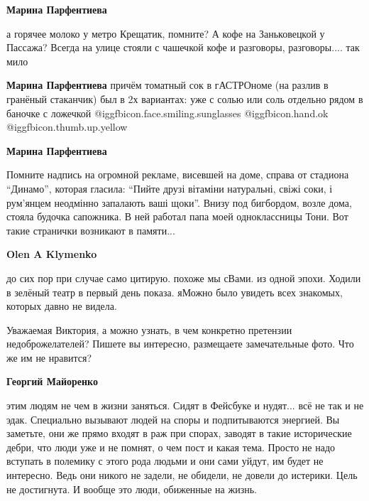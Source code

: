 \begin{itemize}
\begin{itemize} %
\textbf{Марина Парфентиева} 

а горячее молоко у метро Крещатик, помните? А кофе на Заньковецкой у Пассажа?
Всегда на улице стояли с чашечкой кофе и разговоры, разговоры.... так мило

\textbf{Марина Парфентиева} причём томатный сок в гАСТРОноме (на разлив в гранёный стаканчик) был в 2х вариантах: уже с солью или соль отдельно рядом в баночке с ложечкой  @igg{fbicon.face.smiling.sunglasses}  @igg{fbicon.hand.ok}  @igg{fbicon.thumb.up.yellow} 

\textbf{Марина Парфентиева} 

Помните надпись на огромной рекламе, висевшей на доме, справа от стадиона
\enquote{Динамо}, которая гласила: \enquote{Пийте друзі вітаміни натуральні, свіжі соки, і
рум'янцем неодмінно запалають ваші щоки}. Внизу под бигбордом, возле дома,
стояла будочка сапожника. В ней работал папа моей одноклассницы Тони. Вот такие
странички возникают в памяти...

\begin{itemize} %
\textbf{Olen A Klymenko} 

до сих пор при случае само цитирую. похоже мы сВами. из одной эпохи. Ходили в
зелёный театр в первый день показа. яМожно было увидеть всех знакомых, которых
давно не видела.

\end{itemize} %

\end{itemize} %


Уважаемая Виктория, а можно узнать, в чем конкретно претензии недоброжелателей?
Пишете вы интересно, размещаете замечательные фото. Что же им не нравится?

\begin{itemize} %
\textbf{Георгий Майоренко} 

этим людям не чем в жизни заняться. Сидят в Фейсбуке и нудят... всё не так и не
эдак. Специально вызывают людей на споры и подпитываются энергией. Вы заметьте,
они же прямо входят в раж при спорах, заводят в такие исторические дебри, что
люди уже и не помнят, о чем пост и какая тема. Просто не надо вступать в
полемику с этого рода людьми и они сами уйдут, им будет не интересно. Ведь они
никого не задели, не обидели, не довели до истерики. Цель не достигнута. И вообще
это люди, обиженные на жизнь.


\end{itemize}
\end{itemize}

